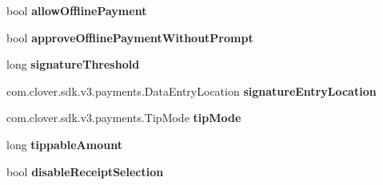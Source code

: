\begin{DoxyCompactItemize}
bool {\bfseries allow\+Offline\+Payment}
\item 
\mbox{\label{classcom_1_1clover_1_1sdk_1_1v3_1_1payments_1_1_transaction_settings_aef67ff8f06211a29b4d69877f44f8d74}} 
bool {\bfseries approve\+Offline\+Payment\+Without\+Prompt}
\item 
\mbox{\label{classcom_1_1clover_1_1sdk_1_1v3_1_1payments_1_1_transaction_settings_a0313cf99617e7c91b986766c417b866c}} 
long {\bfseries signature\+Threshold}
\item 
\mbox{\label{classcom_1_1clover_1_1sdk_1_1v3_1_1payments_1_1_transaction_settings_a4241b44fea03e7f61814938e069a845b}} 
com.\+clover.\+sdk.\+v3.\+payments.\+Data\+Entry\+Location {\bfseries signature\+Entry\+Location}
\item 
\mbox{\label{classcom_1_1clover_1_1sdk_1_1v3_1_1payments_1_1_transaction_settings_a21c1c184b6cb324b394fca0e2461e496}} 
com.\+clover.\+sdk.\+v3.\+payments.\+Tip\+Mode {\bfseries tip\+Mode}
\item 
\mbox{\label{classcom_1_1clover_1_1sdk_1_1v3_1_1payments_1_1_transaction_settings_ab425a82336e4ce66d03c6162310cd14d}} 
long {\bfseries tippable\+Amount}
\item 
\mbox{\label{classcom_1_1clover_1_1sdk_1_1v3_1_1payments_1_1_transaction_settings_ade7e96b40b8a49eefbc21a5b417fc741}} 
bool {\bfseries disable\+Receipt\+Selection}

\end{DoxyCompactItemize}
